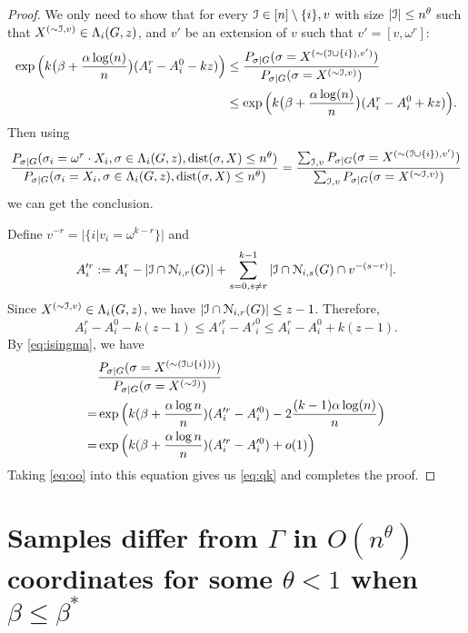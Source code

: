 \documentclass{article}
\begin{document}
\begin{proof}
We only need to show that for every $\mathcal{I}\in [n]\setminus\{i\},v$ with size $|\mathcal{I}|\le n^\theta$ such that $X^{(\sim\mathcal{I},v)}\in \Lambda_i(G,z)$,
and $v'$ be an extension of $v$ such that $v'=[v, \omega^r]$:
\begin{equation} \label{eq:qk}
\begin{aligned}
\exp\Big(k\big(\beta+\frac{\alpha\log(n)}{n} \big) (A^r_i-A^0_i - kz) \Big) & \le 
\frac{P_{\sigma|G}(\sigma= X^{(\sim(\mathcal{I}\cup\{i\}), v')} ) } { P_{\sigma|G}(\sigma= X^{(\sim\mathcal{I},v)} ) } \\
& \le \exp\Big(k\big(\beta+\frac{\alpha\log(n)}{n} \big) (A^r_i-A^0_i + kz) \Big) .
\end{aligned}
\end{equation}
Then using 
$$
\frac{P_{\sigma|G}(\sigma_i= \omega^r \cdot X_i, \sigma\in \Lambda_i(G,z) ,\operatorname{dist}(\sigma, X) \le n^{\theta} ) } 
{ P_{\sigma|G}(\sigma_i=X_i, \sigma\in \Lambda_i(G,z) ,\operatorname{dist}(\sigma, X) \le n^{\theta} ) } 
= \frac{\sum_{\mathcal{I}, v} P_{\sigma|G}(\sigma= X^{(\sim(\mathcal{I}\cup\{i\}), v')} ) } {\sum_{\mathcal{I}, v} P_{\sigma|G}(\sigma= X^{(\sim\mathcal{I},v)} ) } 
$$
we can get the conclusion.

Define $v^{-r} = |\{i | v_i = \omega^{k-r}\}|$ and
$$
A'^r_i :=A^r_i-|\mathcal{I}\cap \mathcal{N}_{i,r}(G)| + \sum_{s=0, s\neq r}^{k-1}|\mathcal{I}\cap \mathcal{N}_{i,s}(G) \cap v^{-(s-r)}| .
$$
Since $X^{(\sim\mathcal{I}, v)}\in \Lambda_i(G,z)$, we have $|\mathcal{I}\cap \mathcal{N}_{i,r}(G)| \le z-1$. Therefore,
\begin{equation} \label{eq:oo}
A^r_i-A^0_i-k(z-1) \le A'^r_i-A'^0_i\le A^r_i-A^0_i+k(z-1) .
\end{equation}
By \eqref{eq:isingma}, we have
\begin{align*}
& \frac{P_{\sigma|G}(\sigma= X^{(\sim(\mathcal{I}\cup\{i\}))} ) } { P_{\sigma|G}(\sigma= X^{(\sim\mathcal{I})} ) } \\
= & \exp\Big(k(\beta+\frac{\alpha\log n }{n})(A'^r_i-A'^0_i)
-2\frac{(k-1)\alpha\log(n)}{n}
\Big)
 \\
= & \exp\Big(k(\beta+\frac{\alpha\log n }{n})(A'^r_i-A'^0_i)+o(1) \Big)
\end{align*}
Taking \eqref{eq:oo} into this equation gives us \eqref{eq:qk} and completes the proof.
\end{proof}
\section{Samples differ from $\Gamma$ in $O(n^{\theta})$ coordinates for some $\theta<1$ when $\beta\le\beta^\ast$}
\label{sect:theta}
\end{document}
